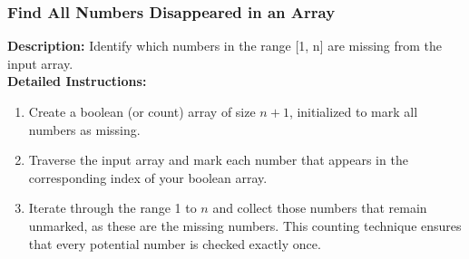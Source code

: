 \subsubsection{Find All Numbers Disappeared in an Array}
\textbf{Description:} Identify which numbers in the range [1, n] are missing from the input array. \\
\textbf{Detailed Instructions:}
\begin{enumerate}
    \item Create a boolean (or count) array of size \(n+1\), initialized to mark all numbers as missing.
    \item Traverse the input array and mark each number that appears in the corresponding index of your boolean array.
    \item Iterate through the range 1 to \(n\) and collect those numbers that remain unmarked, as these are the missing numbers. This counting technique ensures that every potential number is checked exactly once.
\end{enumerate}